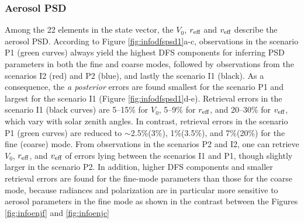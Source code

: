 \subsubsection{Aerosol PSD}

Among the 22 elements in the state vector, the $V_0$, $r_\text{eff}$ and $v_\text{eff}$ 
describe the aerosol PSD. According to Figure \ref{fig:infodfspsd1}a-c, 
observations in the scenario P1 (green curves) always yield the highest 
DFS components for inferring PSD parameters in both the fine and coarse modes,
followed by observations from the scenarios I2 (red) and P2 (blue), and lastly
the scenario I1 (black). As a consequence, the \textit{a posterior} errors are
found smallest for the scenario P1 and largest for the scenario I1 (Figure 
\ref{fig:infodfspsd1}d-e). Retrieval errors in the scenario I1 (black curves)
are 5--15\% for $V_0$, 5--9\% for $r_\text{eff}$, and 20--30\% for $v_\text{eff}$,
which vary with solar zenith angles. In contrast, retrieval errors in the
scenario P1 (green curves) are reduced to $\sim$2.5\%(3\%), 1\%(3.5\%), and 
7\%(20\%) for the fine (coarse) mode. From observations in the scenarios P2
and I2, one can retrieve $V_0$, $r_\text{eff}$, and $v_\text{eff}$ of errors lying between
the scenarios I1 and P1, though slightly larger in the scenario P2. 
In addition, higher DFS components and smaller retrieval errors are found for
the fine-mode parameters than those for the coarse mode, because radiances
and polarization are in particular more sensitive to aerosol parameters in the
fine mode as shown in the contrast between the Figures \ref{fig:infoenjf} and 
\ref{fig:infoenjc}

